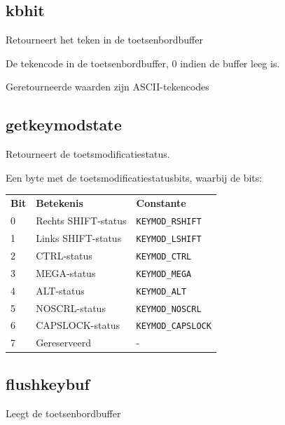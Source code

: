 \subsection{kbhit}
\begin{description}[leftmargin=2.4cm,style=nextline]
\item [Beschrijving:] { Retourneert het teken in de toetsenbordbuffer }\item [Syntaxis:] \item [Resultaat:] {De tekencode in de toetsenbordbuffer, 0 indien de buffer leeg is. }\item [Opmerkingen:] {Geretourneerde waarden zijn ASCII-tekencodes}
\end{description}

\subsection{getkeymodstate}
\begin{description}[leftmargin=2.4cm,style=nextline]
\item [Beschrijving:] {   Retourneert de toetsmodificatiestatus.}\item [Syntaxis:] \item [Resultaat:] {Een byte met de toetsmodificatiestatusbits,    waarbij de bits:

    \begin{tabular}{lll}
\textbf{Bit} & \textbf{Betekenis} & \textbf{Constante}        \\    0   & Rechts SHIFT-status & \texttt{KEYMOD\_RSHIFT} \\    1   & Links SHIFT-status & \texttt{KEYMOD\_LSHIFT} \\    2   & CTRL-status        & \texttt{KEYMOD\_CTRL}  \\    3   & MEGA-status        & \texttt{KEYMOD\_MEGA} \\    4   & ALT-status         & \texttt{KEYMOD\_ALT} \\    5   & NOSCRL-status      & \texttt{KEYMOD\_NOSCRL} \\    6   & CAPSLOCK-status    & \texttt{KEYMOD\_CAPSLOCK} \\    7   & Gereserveerd       & - \\
    \end{tabular}
    }
\end{description}

\subsection{flushkeybuf}
\begin{description}[leftmargin=2.4cm,style=nextline]
\item [Beschrijving:] {Leegt de toetsenbordbuffer}\item [Syntaxis:] 
\end{description}

